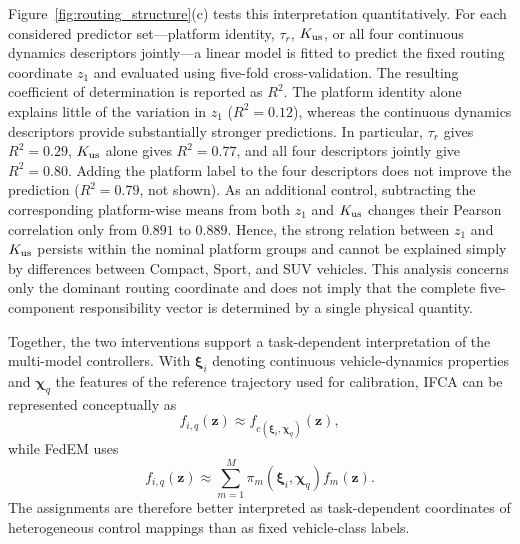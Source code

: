 Figure~\ref{fig:routing_structure}(c) tests this interpretation quantitatively.
For each considered predictor set---platform identity, $\tau_r$, $K_{\rm us}$, or all four continuous dynamics descriptors jointly---a linear model is fitted to predict the fixed routing coordinate $z_1$ and evaluated using five-fold cross-validation.
The resulting coefficient of determination is reported as $R^2$.
The platform identity alone explains little of the variation in $z_1$ ($R^2=0.12$), whereas the continuous dynamics descriptors provide substantially stronger predictions.
In particular, $\tau_r$ gives $R^2=0.29$, $K_{\rm us}$ alone gives $R^2=0.77$, and all four descriptors jointly give $R^2=0.80$.
Adding the platform label to the four descriptors does not improve the prediction ($R^2=0.79$, not shown).
As an additional control, subtracting the corresponding platform-wise means from both $z_1$ and $K_{\rm us}$ changes their Pearson correlation only from $0.891$ to $0.889$.
Hence, the strong relation between $z_1$ and $K_{\rm us}$ persists within the nominal platform groups and cannot be explained simply by differences between Compact, Sport, and SUV vehicles.
This analysis concerns only the dominant routing coordinate and does not imply that the complete five-component responsibility vector is determined by a single physical quantity.

Together, the two interventions support a task-dependent interpretation of the multi-model controllers.
With $\boldsymbol\xi_i$ denoting continuous vehicle-dynamics properties and $\boldsymbol\chi_q$ the features of the reference trajectory used for calibration, IFCA can be represented conceptually as
%
\begin{equation}
    f_{i,q}(\boldsymbol z)\approx f_{c(\boldsymbol\xi_i,\boldsymbol\chi_q)}(\boldsymbol z),
\label{eq:ifca_joint_structure}
\end{equation}
%
while FedEM uses
%
\begin{equation}
    f_{i,q}(\boldsymbol z)\approx
\sum_{m=1}^{M}\pi_m(\boldsymbol\xi_i,\boldsymbol\chi_q)f_m(\boldsymbol z).
\label{eq:fedem_joint_structure}
\end{equation}
%
The assignments are therefore better interpreted as task-dependent coordinates of heterogeneous control mappings than as fixed vehicle-class labels.

\FloatBarrier

